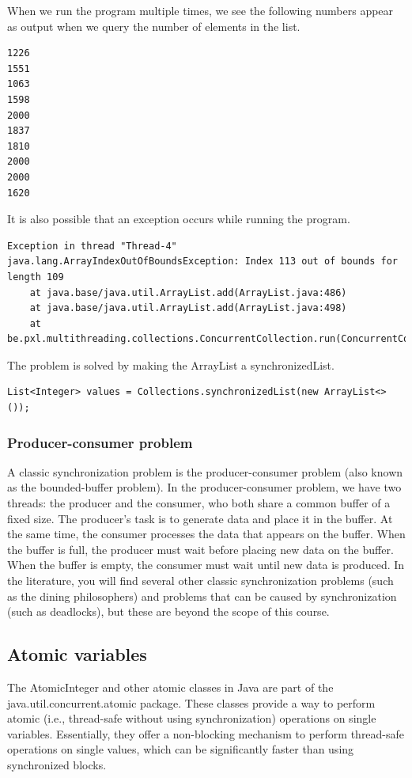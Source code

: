 When we run the program multiple times, we see the following numbers appear as output when we query the number of elements in the list.

\begin{verbatim}
1226
1551
1063
1598
2000
1837
1810
2000
2000
1620
\end{verbatim}

It is also possible that an exception occurs while running the program.
\begin{verbatim}
Exception in thread "Thread-4" java.lang.ArrayIndexOutOfBoundsException: Index 113 out of bounds for length 109
	at java.base/java.util.ArrayList.add(ArrayList.java:486)
	at java.base/java.util.ArrayList.add(ArrayList.java:498)
	at be.pxl.multithreading.collections.ConcurrentCollection.run(ConcurrentCollection.java:20)
\end{verbatim}

The problem is solved by making the ArrayList a synchronizedList.

\begin{lstlisting}
List<Integer> values = Collections.synchronizedList(new ArrayList<>());
\end{lstlisting}

\subsubsection{Producer-consumer problem}

A classic synchronization problem is the producer-consumer problem (also known as the bounded-buffer problem). In the producer-consumer problem, we have two threads: the producer and the consumer, who both share a common buffer of a fixed size. The producer's task is to generate data and place it in the buffer. At the same time, the consumer processes the data that appears on the buffer. When the buffer is full, the producer must wait before placing new data on the buffer. When the buffer is empty, the consumer must wait until new data is produced.
In the literature, you will find several other classic synchronization problems (such as the dining philosophers) and problems that can be caused by synchronization (such as deadlocks), but these are beyond the scope of this course.

\subsection{Atomic variables}

The AtomicInteger and other atomic classes in Java are part of the java.util.concurrent.atomic package. These classes provide a way to perform atomic (i.e., thread-safe without using synchronization) operations on single variables. Essentially, they offer a non-blocking mechanism to perform thread-safe operations on single values, which can be significantly faster than using synchronized blocks.
 
